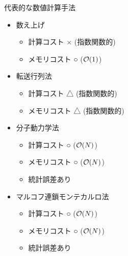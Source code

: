 \begin{frame}[t,fragile]{代表的な数値計算手法}
  \begin{itemize}
  \item {\color{red}数え上げ}
    \begin{itemize}
      \item 計算コスト × (指数関数的)
      \item メモリコスト ○ (${\cal O}(1)$)
    \end{itemize}
  \item {\color{red}転送行列法}
    \begin{itemize}
      \item 計算コスト △ (指数関数的)
      \item メモリコスト △ (指数関数的)
    \end{itemize}
  \item {\color{red}分子動力学法}
    \begin{itemize}
      \item 計算コスト ○ (${\cal O}(N)$)
      \item メモリコスト ○ (${\cal O}(N)$)
      \item 統計誤差あり
    \end{itemize}
  \item マルコフ連鎖モンテカルロ法
    \begin{itemize}
      \item 計算コスト ○ (${\cal O}(N)$)
      \item メモリコスト ○ (${\cal O}(N)$)
      \item 統計誤差あり
    \end{itemize}
  \end{itemize}
\end{frame}
